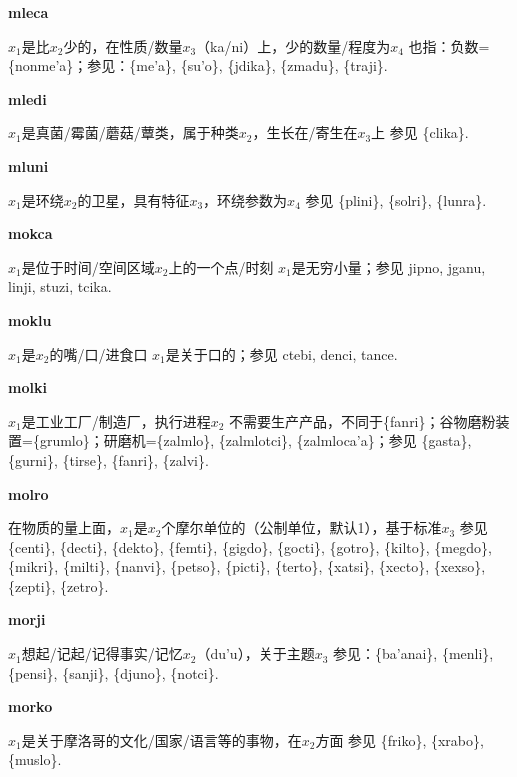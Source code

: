 \documentclass[notitlepage,twocolumn,a4paper,10pt]{book}
\begin{document}
{\sffamily\bfseries mleca}\enspace {\ttfamily\bfseries[mec     me'a]}  $x_1$是比$x_2$少的，在性质\slash{}数量$x_3$（ka\slash{}ni）上，少的数量\slash{}程度为$x_4$ \textemdash{} 也指：负数= \{nonme'a\}；参见：\{me'a\}, \{su'o\}, \{jdika\}, \{zmadu\}, \{traji\}.

{\sffamily\bfseries mledi}\enspace {\ttfamily\bfseries[led]}  $x_1$是真菌\slash{}霉菌\slash{}蘑菇\slash{}蕈类，属于种类$x_2$，生长在\slash{}寄生在$x_3$上 \textemdash{} 参见 \{clika\}.

{\sffamily\bfseries mluni}\enspace {\ttfamily\bfseries[lun]}  $x_1$是环绕$x_2$的卫星，具有特征$x_3$，环绕参数为$x_4$ \textemdash{} 参见 \{plini\}, \{solri\}, \{lunra\}.

{\sffamily\bfseries mokca}\enspace {\ttfamily\bfseries[moc]}  $x_1$是位于时间\slash{}空间区域$x_2$上的一个点\slash{}时刻 \textemdash{} $x_1$是无穷小量；参见 {jipno}, {jganu}, {linji}, {stuzi}, {tcika}.

{\sffamily\bfseries moklu}\enspace {\ttfamily\bfseries[mol     mo'u]}  $x_1$是$x_2$的嘴\slash{}口\slash{}进食口 \textemdash{} $x_1$是关于口的；参见 {ctebi}, {denci}, {tance}.

{\sffamily\bfseries molki}\enspace {\ttfamily\bfseries[    mlo]}  $x_1$是工业工厂\slash{}制造厂，执行进程$x_2$ \textemdash{} 不需要生产产品，不同于\{fanri\}；谷物磨粉装置=\{grumlo\}；研磨机=\{zalmlo\}, \{zalmlotci\}, \{zalmloca'a\}；参见 \{gasta\}, \{gurni\}, \{tirse\}, \{fanri\}, \{zalvi\}.

{\sffamily\bfseries molro}\enspace {\ttfamily\bfseries[        mo'o]}  在物质的量上面，$x_1$是$x_2$个摩尔单位的（公制单位，默认1），基于标准$x_3$ \textemdash{} 参见 \{centi\}, \{decti\}, \{dekto\}, \{femti\}, \{gigdo\}, \{gocti\}, \{gotro\}, \{kilto\}, \{megdo\}, \{mikri\}, \{milti\}, \{nanvi\}, \{petso\}, \{picti\}, \{terto\}, \{xatsi\}, \{xecto\}, \{xexso\}, \{zepti\}, \{zetro\}.

{\sffamily\bfseries morji}\enspace {\ttfamily\bfseries[moj     mo'i]}  $x_1$想起\slash{}记起\slash{}记得事实\slash{}记忆$x_2$（du'u），关于主题$x_3$ \textemdash{} 参见：\{ba'anai\}, \{menli\}, \{pensi\}, \{sanji\}, \{djuno\}, \{notci\}.

{\sffamily\bfseries morko}\enspace {\ttfamily\bfseries[mor]}  $x_1$是关于摩洛哥的文化\slash{}国家\slash{}语言等的事物，在$x_2$方面 \textemdash{} 参见 \{friko\}, \{xrabo\}, \{muslo\}.
\end{document}
